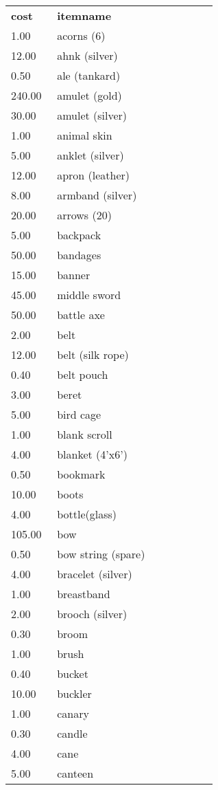 \label{create-equipment-list}
\begin{tcolorbox}[breakable,boxrule=0pt,title=\textbf{Equipment Costs}]
\begin{xtabular}{@{}p{0.2\linewidth} p{0.7\linewidth}}
\small
\textbf{cost} & \textbf{itemname}\\
1.00 & acorns (6)\\
12.00 & ahnk (silver)\\
0.50 & ale (tankard)\\
240.00 & amulet (gold)\\
30.00 & amulet (silver)\\
1.00 & animal skin\\
5.00 & anklet (silver)\\
12.00 & apron (leather)\\
8.00 & armband (silver)\\
20.00 & arrows (20)\\
5.00 & backpack\\
50.00 & bandages\\
15.00 & banner\\
45.00 & middle sword\\
50.00 & battle axe\\
2.00 & belt\\
12.00 & belt (silk rope)\\
0.40 & belt pouch\\
3.00 & beret\\
5.00 & bird cage\\
1.00 & blank scroll\\
4.00 & blanket (4'x6')\\
0.50 & bookmark\\
10.00 & boots\\
4.00 & bottle(glass)\\
105.00 & bow\\
0.50 & bow string (spare)\\
4.00 & bracelet (silver)\\
1.00 & breastband\\
2.00 & brooch (silver)\\
0.30 & broom\\
1.00 & brush\\
0.40 & bucket\\
10.00 & buckler\\
1.00 & canary\\
0.30 & candle\\
4.00 & cane\\
5.00 & canteen\\

\end{xtabular}
\end{tcolorbox}
